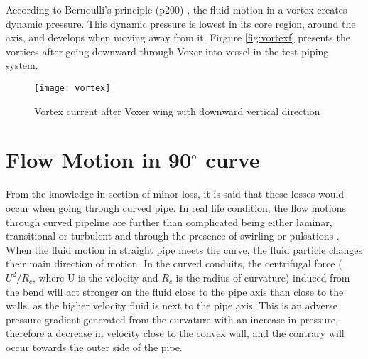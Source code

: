 According to Bernoulli's principle (p200) \cite{cengel:book}, the fluid motion in a vortex creates dynamic pressure. This dynamic pressure is lowest in its core region, around the axis, and develops when moving away from it. Firgure \vref{fig:vortexf} presents the vortices after going downward through Voxer into vessel in the test piping system. 

\begin{figure}[h]
  \centering
  \texttt{[image: vortex]}
  \caption{Vortex current after Voxer wing with downward vertical direction}
  \label{fig:vortexf}
\end{figure}

\section{Flow Motion in 90$^{\circ}$ curve}
From the knowledge in section of minor loss, it is said that these losses would occur when going through curved pipe. In real life condition, the flow motions through curved pipeline are further than complicated being either laminar, transitional or turbulent and through the presence of swirling or pulsations \cite{curve:article}.  When the fluid motion in straight pipe meets the curve, the fluid particle changes their main direction of motion. In the curved conduits, the centrifugal force ($U^{2} / R_{c}$, where U is the velocity and $R_{c}$ is the radius of curvature) induced from the bend will act stronger on the fluid close to the pipe axis than close to the walls. as the higher velocity fluid is next to the pipe axis. This is an adverse pressure gradient generated from the curvature with an increase in pressure, therefore a decrease in velocity close to the convex wall, and the contrary will occur towards the outer side of the pipe. 

\clearpage %
